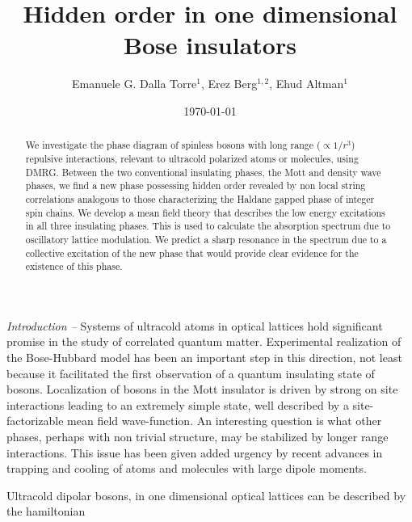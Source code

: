\documentclass[prb,twocolumn,,amsmath,amssymb,floatfix]{revtex4}
\begin{document}
\title{Hidden order in one dimensional Bose insulators}

\author{Emanuele G. Dalla Torre$^1$, Erez Berg$^{1,2}$, Ehud Altman$^1$}

\begin{abstract}
We investigate the phase diagram of spinless bosons with long range
($\propto 1/r^3$) repulsive interactions, relevant to ultracold
polarized atoms or molecules, using DMRG. Between the two
conventional insulating phases, the Mott and density wave phases, we
find a new phase possessing hidden order revealed by non local
string correlations analogous to those characterizing the Haldane
gapped phase of integer spin chains. We develop a mean field theory
that describes the low energy excitations in all three insulating
phases. This is used to calculate the absorption spectrum due to
oscillatory lattice modulation. We predict a sharp resonance in the
spectrum due to a collective excitation of the new phase that would
provide clear evidence for the existence of this phase.
\end{abstract}

\date{\today}

\maketitle

{\em Introduction --} Systems of ultracold atoms in optical lattices
hold significant promise in the study of correlated quantum matter.
Experimental realization of the Bose-Hubbard model has been an
important step in this direction, not least because it facilitated
the first observation of a quantum insulating state of
bosons\cite{greiner}. Localization of bosons in the Mott insulator
is driven by strong on site interactions leading to an extremely
simple state, well described by a site-factorizable mean field
wave-function. An interesting question is what other phases, perhaps
with non trivial structure, may be stabilized by longer range
interactions\cite{goral,pai,barnett,senthil,buchler}. This issue has
been given added urgency by recent advances in trapping and cooling
of atoms\cite{dipolar-atoms} and molecules\cite{dipolar-molecules}
with large dipole moments.

Ultracold dipolar bosons, in one dimensional optical lattices can be
described by the hamiltonian
\end{document}
